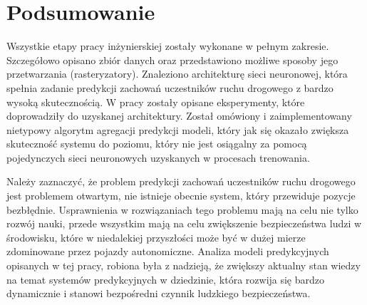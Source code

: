 \chapter{Podsumowanie}
\thispagestyle{chapterBeginStyle}

Wszystkie etapy pracy inżynierskiej zostały wykonane w pełnym zakresie. Szczegółowo opisano zbiór danych oraz przedstawiono możliwe sposoby jego przetwarzania (rasteryzatory). Znaleziono architekturę sieci neuronowej, która spełnia zadanie predykcji zachowań uczestników ruchu drogowego z bardzo wysoką skutecznością. W pracy zostały opisane eksperymenty, które doprowadziły do uzyskanej architektury. Został omówiony i zaimplementowany nietypowy algorytm agregacji predykcji modeli, który jak się okazało zwiększa skuteczność systemu do poziomu, który nie jest osiągalny za pomocą pojedynczych sieci neuronowych uzyskanych w procesach trenowania.

\vspace{1em}

Należy zaznaczyć, że problem predykcji zachowań uczestników ruchu drogowego jest problemem otwartym, nie istnieje obecnie system, który przewiduje pozycje bezbłędnie. Usprawnienia w rozwiązaniach tego problemu mają na celu nie tylko rozwój nauki, przede wszystkim mają na celu zwiększenie bezpieczeństwa ludzi w środowisku, które w niedalekiej przyszłości może być w dużej mierze zdominowane przez pojazdy autonomiczne. Analiza modeli predykcyjnych opisanych w tej pracy, robiona była z nadzieją, że zwiększy aktualny stan wiedzy na temat systemów predykcyjnych w dziedzinie, która rozwija się bardzo dynamicznie i stanowi bezpośredni czynnik ludzkiego bezpieczeństwa.